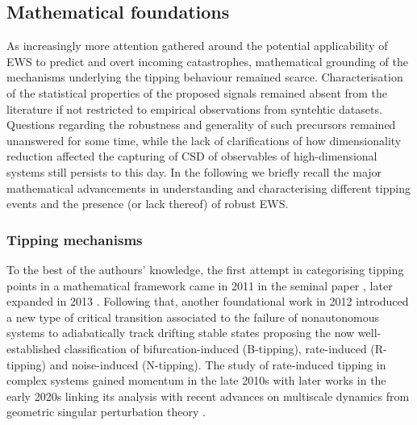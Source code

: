 \documentclass[dvipsnames, table, 11pt]{article}
\begin{document}
\subsection{Mathematical foundations}
As increasingly more attention gathered around the potential applicability of EWS to predict and overt incoming catastrophes, mathematical grounding of the mechanisms underlying the tipping behaviour remained scarce.
Characterisation of the statistical properties of the proposed signals remained absent from the literature if not restricted to empirical observations from syntehtic datasets.
Questions regarding the robustness and generality of such precursors remained unanswered for some time, while the lack of clarifications of how dimensionality reduction affected the capturing of CSD of observables of high-dimensional systems still persists to this day.
In the following we briefly recall the major mathematical advancements in understanding and characterising different tipping events and the presence (or lack thereof) of robust EWS.

\subsubsection{Tipping mechanisms}
To the best of the authours' knowledge, the first attempt in categorising tipping points in a mathematical framework came in 2011 in the seminal paper \cite{Kuehn2011}, later expanded in 2013 \cite{Kuehn2013}.
Following that, another foundational work in 2012 \cite{Ashwin2012} introduced a new type of critical transition associated to the failure of nonautonomous systems to adiabatically track drifting stable states proposing the now well-established classification of bifurcation-induced (B-tipping), rate-induced (R-tipping) and noise-induced (N-tipping).
The study of rate-induced tipping in complex systems gained momentum in the late 2010s \cite{Ashwin2017, Ritchie2017} with later works in the early 2020s \cite{Vanselow2019, OSullivan2023} linking its analysis with recent advances on multiscale dynamics from geometric singular perturbation theory \cite{Wechselberger2020}.
\end{document}

